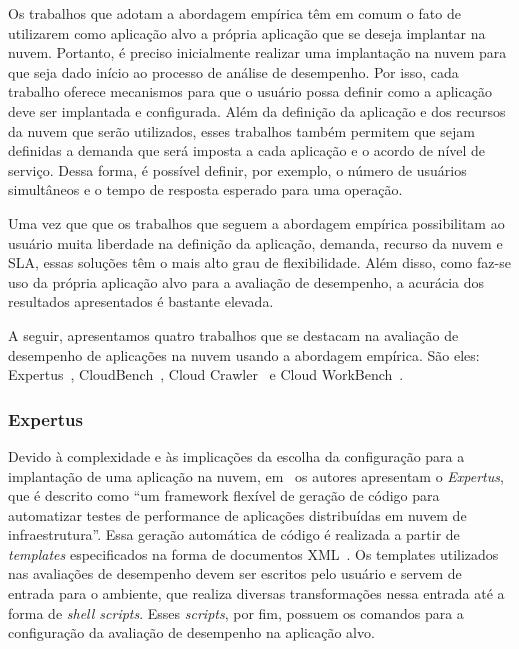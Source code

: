 Os trabalhos que adotam a abordagem empírica têm em comum o fato de utilizarem como aplicação alvo a própria aplicação que se deseja implantar na nuvem. Portanto, é preciso inicialmente realizar uma implantação na nuvem para que seja dado início ao processo de análise de desempenho. Por isso, cada trabalho oferece mecanismos para que o usuário possa definir como a aplicação deve ser implantada e configurada. Além da definição da aplicação e dos recursos da nuvem que serão utilizados, esses trabalhos também permitem que sejam definidas a demanda que será imposta a cada aplicação e o acordo de nível de serviço. Dessa forma, é possível definir, por exemplo, o número de usuários simultâneos e o tempo de resposta esperado para uma operação.

Uma vez que que os trabalhos que seguem a abordagem empírica possibilitam ao usuário muita liberdade na definição da aplicação, demanda, recurso da nuvem e SLA, essas soluções têm o mais alto grau de flexibilidade. Além disso, como faz-se uso da própria aplicação alvo para a avaliação de desempenho, a acurácia dos resultados apresentados é bastante elevada. 

A seguir, apresentamos quatro trabalhos que se destacam na avaliação de desempenho de aplicações na nuvem usando a abordagem empírica. São eles: Expertus~\cite{jayasinghe2012}, CloudBench~\cite{silva2013cloudbench}, Cloud Crawler~\cite{cunhacloud,cunha2013b} e Cloud WorkBench~\cite{scheuner2014cloud}.

\subsubsection{Expertus}
Devido à complexidade e às implicações da escolha da configuração para a implantação de uma aplicação na nuvem, em~\cite{jayasinghe2012} os autores apresentam o \textit{Expertus}, que é descrito como ``um framework flexível de geração de código para automatizar testes de performance de aplicações distribuídas em nuvem de infraestrutura''. Essa geração automática de código é realizada a partir de {\em templates} especificados na forma de documentos XML~\cite{jayasinghe2012}. Os templates utilizados nas avaliações de desempenho devem ser escritos pelo usuário e servem de entrada para o ambiente, que realiza diversas transformações nessa entrada até a forma de \textit{shell scripts}. Esses \textit{scripts}, por fim, possuem os comandos para a configuração da avaliação de desempenho na aplicação alvo.

